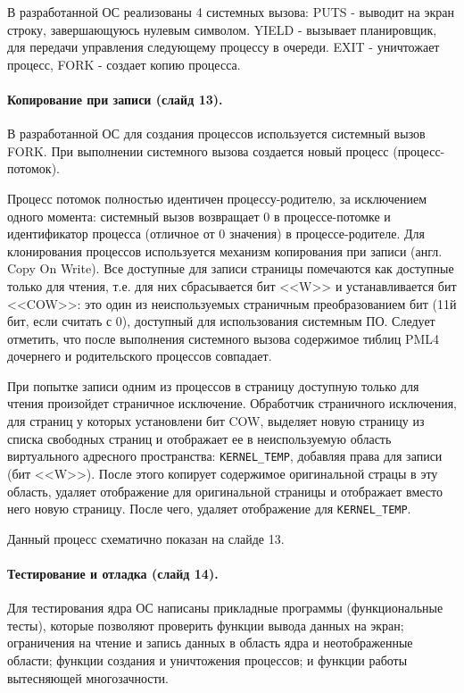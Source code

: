 \documentclass[12pt]{article}
\begin{document}
В разработанной ОС реализованы 4 системных вызова: PUTS - выводит на экран строку, завершающуюсь нулевым
символом. YIELD - вызывает планировщик, для передачи управления следующему процессу в очереди. EXIT -
уничтожает процесс, FORK - создает копию процесса.

\paragraph{Копирование при записи (слайд 13).}
В разработанной ОС для создания процессов используется системный вызов FORK. При выполнении системного
вызова создается новый процесс (процесс-потомок).

Процесс потомок полностью идентичен процессу-родителю, за исключением одного момента: системный вызов
возвращает 0 в процессе-потомке и идентификатор процесса (отличное от 0 значения) в процессе-родителе. Для
клонирования процессов используется механизм копирования при записи (англ. Copy On Write). Все доступные для записи
страницы помечаются как доступные только для чтения, т.е. для них сбрасывается бит <<W>> и устанавливается бит <<COW>>:
это один из неиспользуемых страничным преобразованием бит (11й бит, если считать с 0), доступный для использования
системным ПО. Следует отметить, что после выполнения системного вызова содержимое тиблиц PML4 дочернего и родительского
процессов совпадает.

При попытке записи одним из процессов в страницу доступную только для чтения произойдет страничное исключение.
Обработчик страничного исключения, для страниц у которых установлени бит COW, выделяет новую страницу из списка
свободных страниц и отображает ее в неиспользуемую область виртуального адресного пространства: \texttt{KERNEL\_TEMP},
добавляя права для записи (бит <<W>>). После этого копирует содержимое оригинальной страцы в эту область, удаляет
отображение для оригинальной страницы и отображает вместо него новую страницу. После чего, удаляет отображение для
\texttt{KERNEL\_TEMP}.

Данный процесс схематично показан на слайде 13.

\paragraph{Тестирование и отладка (слайд 14).}
Для тестирования ядра ОС написаны прикладные программы (функциональные тесты), которые позволяют
проверить функции вывода данных на экран; ограничения на чтение и запись данных в область ядра
и неотображенные области; функции создания и уничтожения процессов; и функции работы вытесняющей многозачности.
\end{document}
